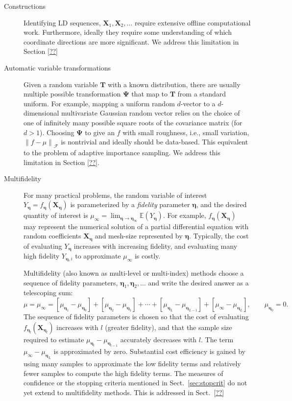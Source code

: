 \documentclass[11pt]{NSFamsart}
\newcommand{\fidparam}{\bldeta}
\newcommand{\bbE}{\mathbb{E}}
\newcommand{\bT}{{\boldsymbol{T}}}
\newcommand{\bX}{{\boldsymbol{X}}}
\newcommand{\bPsi}{{\boldsymbol{\Psi}}}
\newcommand{\bldeta}{{\boldsymbol{\eta}}}
\newcommand{\calf}{{\mathcal{F}}}
\newcommand{\norm}[2][{}]{\ensuremath{\left \lVert #2 \right \rVert}_{#1}}
\begin{document}
\begin{description}

\item[Constructions] Identifying LD sequences, $\bX_1, \bX_2, \ldots$ require extensive offline computational work.  Furthermore, ideally they require some understanding of which coordinate directions are more significant. We address this limitation in Section \ref{??} 

\item[Automatic variable transformations]  Given a random variable $\bT$ with a known distribution, there are usually multiple possible transformation $\bPsi$ that map to $\bT$ from a standard uniform.  For example, mapping a uniform random $d$-vector to a $d$-dimensional multivariate Gaussian random vector relies on the choice of one of infinitely many possible square roots of the covariance matrix (for $d>1$).  Choosing $\bPsi$ to give an $f$ with small roughness, i.e., small variation, $\norm[\calf]{f - \mu}$ is nontrivial and ideally should be data-based. This equivalent to the problem of adaptive importance sampling. We address this limitation in Section \ref{??}.

\item[Multifidelity] For many practical problems, the random variable of interest $Y_\fidparam = f_\fidparam(\bX_\fidparam)$ is parameterized by a \emph{fidelity} parameter $\fidparam$, and the desired quantity of interest is $\mu_\infty = \lim_{\fidparam \to \fidparam_\infty} \bbE(Y_\fidparam)$.  For example, $f_\fidparam(\bX_\fidparam)$ may represent the numerical solution of  a partial differential equation with random coefficients $\bX_\fidparam$ and mesh-size represented by $\fidparam$.  Typically, the cost of evaluating $Y_\fidparam$ increases with increasing fidelity, and evaluating many high fidelity $Y_{\fidparam,i}$ to approximate $\mu_\infty$ is costly.

Multifidelity (also known as multi-level or multi-index) methods \cite{Hei01a, Gil15a, HajNobTem16a} choose a sequence of fidelity parameters, $\fidparam_1, \fidparam_2, \ldots$ and write the desired answer as a telescoping sum: 
\[
\mu = \mu_\infty = [\mu_{\fidparam_1} - \mu_{\fidparam_0}] + [\mu_{\fidparam_2} - \mu_{\fidparam_1}] + \cdots +
[\mu_{\fidparam_L} - \mu_{\fidparam_{L-1}}] + [\mu_{\infty} - \mu_{\fidparam_{L}}], \qquad \mu_{\fidparam_0} = 0.
\]
The sequence of fidelity parameters is chosen so that the cost of evaluating $f_{\fidparam_l}(\bX_{\fidparam_l})$  increases with $l$ (greater fidelity), and that the sample size required to estimate $\mu_{\fidparam_l} - \mu_{\fidparam_{l-1}}$ accurately decreases with $l$. The term  $\mu_{\infty} - \mu_{\fidparam_{L}}$ is approximated by zero. Substantial cost efficiency is gained by using many samples to approximate the low fidelity terms and relatively fewer samples to compute the high fidelity terms.  The measures of confidence or the stopping criteria mentioned in Sect.\ \ref{sec:stopcrit} do not yet extend to multifidelity methods.  This is addressed in Sect.\ \ref{??}


\end{description}
\end{document}
